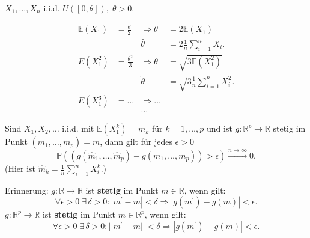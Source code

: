 \documentclass{tstextbook}
\newcommand{\E}{\mathbb E}
\newcommand{\R}{\mathbb R}
\newcommand{\Prob}{\mathbb P}
\begin{document}
\begin{example}[Gleichverteilung]
	$ X_1, \ldots, X_n $ i.i.d. $ U([0,\theta]), \; \theta > 0 $.
	
	\[
	\begin{aligned}
		\E(X_1) &= \frac{\theta}{2} & \Rightarrow \theta & = 2\E\left(X_1\right) \\
		& & \hat{\theta} & = 2 \frac{1}{n} \sum_{i=1}^{n} X_i. \\
		E(X_1^2) &= \frac{\theta^2}{3} & \Rightarrow \theta & = \sqrt{3\E\left(X_1^2\right)} \\
		& & \tilde{\theta} & = \sqrt{3\frac{1}{n} \sum_{i=1}^{n} X_i^2}. \\
		E(X_1^3) &= \ldots & \Rightarrow \ldots \\
		& & \ldots
	\end{aligned}
	\]
	
\end{example}


\begin{lemma}
	\label{lemma_stetig}
	Sind $ X_1,X_2,\ldots $ i.i.d. mit $ \E(X_1^k) = m_k $ für $ k = 1,\ldots, p $ und ist $ g:\R^p \rightarrow \R $ stetig im Punkt $ \left(m_1, \ldots, m_p \right) = m $, dann gilt für jedes $ \epsilon > 0 $
	\[
	\Prob\left(\left(g\left(\hat{m}_1,\ldots,\hat{m}_p\right)-g\left(m_1,\ldots,m_p\right)\right) > \epsilon \right) \overset{n\to\infty}{\longrightarrow} 0.
	\]
	(Hier ist $ \hat{m}_k = \frac{1}{n} \sum_{i=1}^{n} X_i^k $.)
\end{lemma}


\begin{remark}
	Erinnerung:
	$ g: \R \rightarrow \R $ ist \textbf{stetig} im Punkt $ m \in \R $, wenn gilt: 
	\[ \forall \epsilon > 0 \; \exists \, \delta >0 \colon |m^\prime - m| < \delta \Rightarrow |g(m^\prime) - g(m)| < \epsilon. \]
	$ g: \R^p \rightarrow \R $ ist \textbf{stetig} im Punkt $ m \in \R^p $, wenn gilt: 
	\[ \forall \epsilon > 0 \; \exists \, \delta >0 \colon ||m^\prime - m|| < \delta \Rightarrow |g(m^\prime) - g(m)| < \epsilon. \]
\end{remark}
\end{document}
